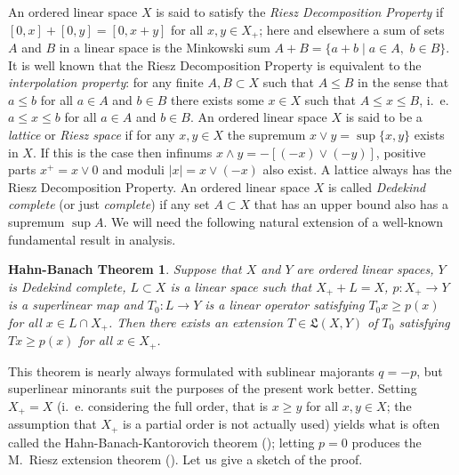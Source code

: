 \documentclass [a4paper, 12pt] {amsart}
\newtheorem* {theoremhahnbanach} {Hahn-Banach Theorem}
\newcommand {\linop} [2] {\ensuremath{\mathfrak L (#1, #2)}}
\begin{document}
An ordered linear space $X$ is said to satisfy the \emph {Riesz Decomposition Property} if $[0, x] + [0, y] = [0, x + y]$
for all $x, y \in X_+$;
here and elsewhere a sum of sets $A$ and $B$ in a linear space is the Minkowski sum $A + B = \{a + b \mid a \in A, \,\, b \in B\}$.
It is well known that the Riesz Decomposition Property is equivalent to the \emph {interpolation property}: for any finite $A, B \subset X$ such that
$A \leqslant B$ in the sense that $a \leqslant b$ for all $a \in A$ and $b \in B$ there exists some $x \in X$ such that
$A \leqslant x \leqslant B$, i.~e. $a \leqslant x \leqslant b$ for all $a \in A$ and $b \in B$.
An ordered linear space $X$ is said to be a \emph {lattice} or \emph {Riesz space} if for any $x, y \in X$ the supremum $x \vee y = \sup \{x, y\}$
exists in $X$.  If this is the case then infinums $x \wedge y = -[(-x) \vee (-y)]$, positive parts $x^+ = x \vee 0$
and moduli $|x| = x \vee (-x)$ also exist.
A lattice always has the Riesz Decomposition Property.
An ordered linear space $X$ is called \emph {Dedekind complete} (or just \emph {complete}) if any set $A \subset X$ that has an upper bound also
has a supremum %
$\sup A$.
We will need the following natural extension of a well-known fundamental result in analysis.
\begin {theoremhahnbanach}
Suppose that $X$ and $Y$ are ordered linear spaces,
$Y$ is Dedekind complete, $L \subset X$ is a linear space such that $X_+ + L = X$,
$p : X_+ \to Y$ is a superlinear map and $T_0 : L \to Y$ is a linear operator satisfying
$T_0 x \geqslant p (x)$ for all $x \in L \cap X_+$.  Then there exists an extension $T \in \linop {X} {Y}$ of $T_0$ satisfying
$T x \geqslant p (x)$ for all $x \in X_+$.
\end {theoremhahnbanach}
This theorem is nearly always formulated with sublinear majorants $q = -p$, but superlinear minorants
suit the purposes of the present work better.
Setting $X_+ = X$ (i.~e. considering the full order, that is $x \geqslant y$ for all $x, y \in X$;
the assumption that $X_+$ is a partial order is not actually used)
yields what is often called the
Hahn-Banach-Kantorovich theorem (\cite {kantorovich1935}); letting $p = 0$ produces the
M.~Riesz extension theorem (\cite {riesz1923}).
Let us give a sketch of the proof. %
\end{document}
